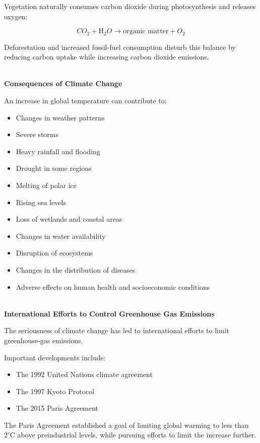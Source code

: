 \documentclass[12pt]{article}
\begin{document}
Vegetation naturally consumes carbon dioxide during photosynthesis and releases oxygen:

\begin{equation*}
CO_2+\text{H}_2O
\rightarrow
\text{organic matter}+O_2
\end{equation*}

Deforestation and increased fossil-fuel consumption disturb this balance by reducing carbon uptake while increasing carbon dioxide emissions.

\textbf{\\ Consequences of Climate Change}

An increase in global temperature can contribute to:

\begin{itemize}
    \item Changes in weather patterns
    \item Severe storms
    \item Heavy rainfall and flooding
    \item Drought in some regions
    \item Melting of polar ice
    \item Rising sea levels
    \item Loss of wetlands and coastal areas
    \item Changes in water availability
    \item Disruption of ecosystems
    \item Changes in the distribution of diseases
    \item Adverse effects on human health and socioeconomic conditions
\end{itemize}

\textbf{\\ International Efforts to Control Greenhouse Gas Emissions}

The seriousness of climate change has led to international efforts to limit greenhouse-gas emissions.

Important developments include:

\begin{itemize}
    \item The 1992 United Nations climate agreement
    \item The 1997 Kyoto Protocol
    \item The 2015 Paris Agreement
\end{itemize}

The Paris Agreement established a goal of limiting global warming to less than $2^\circ\mathrm{C}$ above preindustrial levels, while pursuing efforts to limit the increase further.
\end{document}
